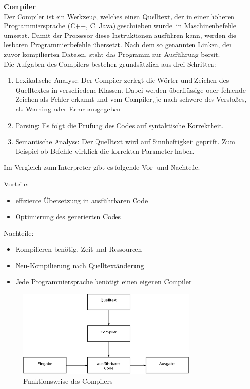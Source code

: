 \textbf{Compiler}\\
Der Compiler ist ein Werkzeug, welches einen Quelltext, der in einer höheren Programmiersprache (C++, C, Java) geschrieben wurde, in Maschinenbefehle umsetzt.
 Damit der Prozessor diese Instruktionen ausführen kann, werden die lesbaren Programmierbefehle übersetzt. Nach dem so genannten Linken, der zuvor kompilierten Dateien,
  steht das Programm zur Ausführung bereit.\\
Die Aufgaben des Compilers bestehen grundsätzlich aus drei Schritten:\cite{compiler}
\begin{enumerate}
  \item Lexikalische Analyse:
  	Der Compiler zerlegt die Wörter und Zeichen des Quelltextes in verschiedene Klassen. Dabei werden überflüssige oder fehlende Zeichen als Fehler erkannt und vom Compiler, je nach
  schwere des Verstoßes, als Warning oder Error ausgegeben.
  \item Parsing:
  	Es folgt die Prüfung des Codes auf syntaktische Korrektheit.
  \item Semantische Analyse: Der Quelltext wird auf Sinnhaftigkeit geprüft. Zum Beispiel ob Befehle wirklich die korrekten Parameter haben.
\end{enumerate}

Im Vergleich zum Interpreter gibt es folgende Vor- und Nachteile.

Vorteile:
\begin{itemize}
  \item effiziente Übersetzung in ausführbaren Code
  \item Optimierung des generierten Codes
\end{itemize}

Nachteile:
\begin{itemize}
  \item Kompilieren benötigt Zeit und Ressourcen
  \item Neu-Kompilierung nach Quelltextänderung
  \item Jede Programmiersprache benötigt einen eigenen Compiler
\end{itemize}

\begin{figure}[H]
\centering
\includegraphics[width=0.8\textwidth]{Hauptteil/Compiler.eps}
\caption{Funktionsweise des Compilers}\label{fig:compiler}
\end{figure}

